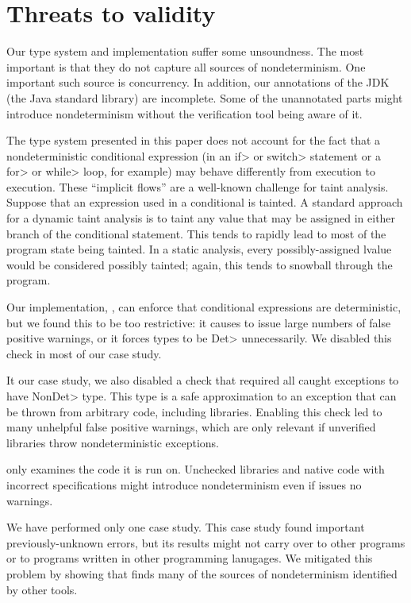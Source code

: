 \section{Threats to validity}\label{sec:threats}

Our type system and implementation suffer some unsoundness.  The most
important is that they do not capture all sources of nondeterminism.  One
important such source is concurrency.
%
In addition, our annotations of the JDK (the Java standard library) are incomplete.
Some of the unannotated parts might introduce nondeterminism without
the verification tool being aware of it.

The type system presented in this paper does not account for the fact that
a nondeterministic conditional expression (in an \<if> or \<switch>
statement or a \<for> or \<while> loop, for example) may behave differently
from execution to execution.
These ``implicit flows'' are a well-known challenge for taint analysis.
Suppose that an expression used in a conditional is tainted.
A standard approach
\cite{Kang2011DTADT,Arzt:2014:FPC:2594291.2594299}
 for a dynamic taint analysis is to taint any value that may
be assigned in either branch of the conditional statement.  This tends to rapidly lead to most of
the program state being tainted.
In a static analysis, every possibly-assigned lvalue would be considered
possibly tainted; again, this tends to snowball through the program.

Our implementation, \theDeterminismChecker, can enforce that conditional
expressions are deterministic, but we found this to be too restrictive:  it
causes \theDeterminismChecker to issue large numbers of false positive
warnings, or it forces types to be \<Det> unnecessarily.
We disabled this check in most of our case study.

It our case study, we also disabled a check that required all caught
exceptions to have \<NonDet> type.  This type is a safe approximation to an
exception that can be thrown from arbitrary code, including libraries.
Enabling this check led to many unhelpful false positive warnings, which
are only relevant if unverified libraries throw nondeterministic exceptions.


\TheDeterminismChecker only examines the code it is run on.  Unchecked
libraries and native code with incorrect specifications might introduce
nondeterminism even if \theDeterminismChecker issues no warnings.


We have performed only one case study.  This case study found important
previously-unknown errors, but its results might not carry over to other
programs or to programs written in other programming lanugages.  We
mitigated this problem by showing that \theDeterminismChecker finds many
of the sources of nondeterminism identified by other tools.
